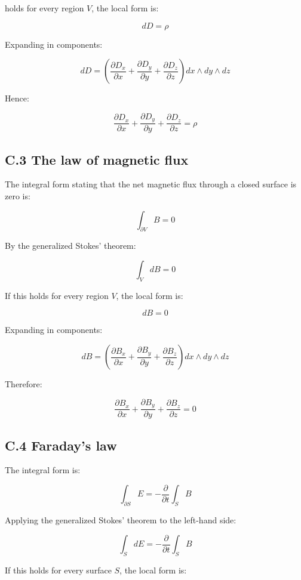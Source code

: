 holds for every region \(V\), the local form is:

\[
dD=\rho
\]

Expanding in components:

\[
dD
=
\left(\frac{\partial D_x}{\partial x}
{}+\frac{\partial D_y}{\partial y}
{}+\frac{\partial D_z}{\partial z}\right)
dx\wedge dy\wedge dz
\]

Hence:

\[
\frac{\partial D_x}{\partial x}
{}+\frac{\partial D_y}{\partial y}
{}+\frac{\partial D_z}{\partial z}
=\rho
\]

\hypertarget{c.3-the-law-of-magnetic-flux}{%
\subsection{C.3 The law of magnetic
flux}\label{c.3-the-law-of-magnetic-flux}}

The integral form stating that the net magnetic flux through a closed
surface is zero is:

\[
\int_{\partial V}B=0
\]

By the generalized Stokes' theorem:

\[
\int_V dB=0
\]

If this holds for every region \(V\), the local form is:

\[
dB=0
\]

Expanding in components:

\[
dB
=
\left(\frac{\partial B_x}{\partial x}
{}+\frac{\partial B_y}{\partial y}
{}+\frac{\partial B_z}{\partial z}\right)
dx\wedge dy\wedge dz
\]

Therefore:

\[
\frac{\partial B_x}{\partial x}
{}+\frac{\partial B_y}{\partial y}
{}+\frac{\partial B_z}{\partial z}
=0
\]

\hypertarget{c.4-faradays-law}{%
\subsection{C.4 Faraday's law}\label{c.4-faradays-law}}

The integral form is:

\[
\int_{\partial S}E
=
-\frac{\partial}{\partial t}\int_S B
\]

Applying the generalized Stokes' theorem to the left-hand side:

\[
\int_S dE
=
-\frac{\partial}{\partial t}\int_S B
\]

If this holds for every surface \(S\), the local form is:

